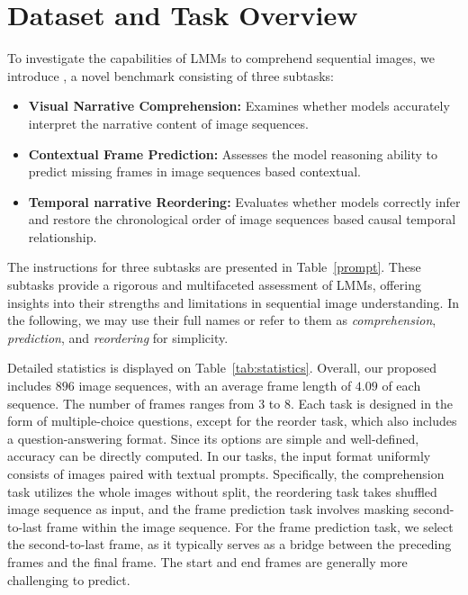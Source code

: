 \section{Dataset and Task Overview}
To investigate the capabilities of LMMs to comprehend sequential images, we introduce \dataset, a novel benchmark consisting of three subtasks:

\begin{itemize}
     \item \textbf{Visual Narrative Comprehension:} Examines whether models accurately interpret the narrative content of image sequences.
      \item \textbf{Contextual Frame Prediction:} Assesses the model reasoning ability to predict missing frames in image sequences based contextual.
      \item \textbf{Temporal narrative Reordering:} Evaluates whether models correctly infer and restore the chronological order of image sequences based causal temporal relationship.
\end{itemize}

The instructions for three subtasks are presented in Table~\ref{prompt}. These subtasks provide a rigorous and multifaceted assessment of LMMs, offering insights into their strengths and limitations in sequential image understanding. In the following, we may use their full names or refer to them as \textit{comprehension}, \textit{prediction}, and \textit{reordering} for simplicity.




Detailed statistics is displayed on Table~\ref{tab:statistics}.
Overall, our proposed \dataset includes $896$ image sequences, with an average frame length of $4.09$ of each sequence. The number of frames ranges from 3 to 8. Each task is designed in the form of multiple-choice questions, except for the reorder task, which also includes a question-answering format. Since its options are simple and well-defined, accuracy can be directly computed. In our tasks, the input format uniformly consists of images paired with textual prompts. Specifically, the comprehension task utilizes the whole images without split, the reordering task takes shuffled image sequence as input,  and the frame prediction task involves masking second-to-last frame within the image sequence.
For the frame prediction task, we select the second-to-last frame, as it typically serves as a bridge between the preceding frames and the final frame. The start and end frames are generally more challenging to predict.


